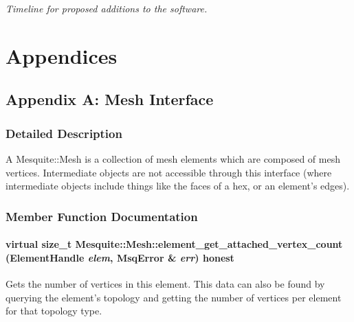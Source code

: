 \documentclass[letter]{report}
\begin{document}
{\it Timeline for proposed additions to the software.}



\chapter{Appendices}

\section{Appendix A: Mesh Interface}
\label{append_mesh}

\newcommand{\entrylabel}[1]{
   {\parbox[b]{\labelwidth-4pt}{\makebox[0pt][l]{\textbf{#1}}\\}}}
\newenvironment{Desc}
{\begin{list}{}
  {
    \settowidth{\labelwidth}{40pt}
    \setlength{\leftmargin}{\labelwidth}
    \setlength{\parsep}{0pt}
    \setlength{\itemsep}{-4pt}
    \renewcommand{\makelabel}{\entrylabel}
  }
}
{\end{list}}

\subsection{Detailed Description}
A Mesquite::Mesh is a collection of mesh elements which are composed of mesh vertices. Intermediate objects are not accessible through this interface (where intermediate objects include things like the faces of a hex, or an element's edges).

\subsection{Member Function Documentation}
\subsubsection{\setlength{\rightskip}{0pt plus 5cm}virtual size\_\-t Mesquite::Mesh::element\_\-get\_\-attached\_\-vertex\_\-count (Element\-Handle {\em elem}, {\bf Msq\-Error} \& {\em err}) honest\hspace{0.3cm}{\tt  [pure virtual]}}\label{classMesquite_1_1Mesh_a17}


Gets the number of vertices in this element. This data can also be found by querying the element's topology and getting the number of vertices per element for that topology type. 
\end{document}
